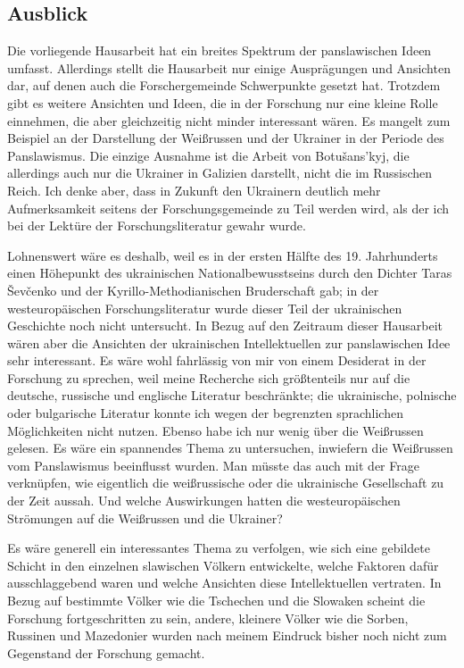 \documentclass{../../sem_paper}
\begin{document}
\subsection*{Ausblick}
Die vorliegende Hausarbeit hat ein breites Spektrum der panslawischen Ideen umfasst.
Allerdings stellt die Hausarbeit nur einige Ausprägungen und Ansichten dar, auf denen auch
die Forschergemeinde Schwerpunkte gesetzt hat. Trotzdem gibt es weitere Ansichten und
Ideen, die in der Forschung nur eine kleine Rolle einnehmen, die aber gleichzeitig nicht
minder interessant wären. Es mangelt zum Beispiel an der Darstellung der Weißrussen und
der Ukrainer in der Periode des Panslawismus. Die einzige Ausnahme ist die Arbeit von
Botušans'kyj\autocite{botushans}, die allerdings auch nur die Ukrainer in Galizien darstellt, nicht die im
Russischen Reich. Ich denke aber, dass in Zukunft den Ukrainern deutlich mehr
Aufmerksamkeit seitens der Forschungsgemeinde zu Teil werden wird, als der ich bei der
Lektüre der Forschungsliteratur gewahr wurde.

Lohnenswert wäre es deshalb, weil es in der ersten Hälfte des 19. Jahrhunderts einen
Höhepunkt des ukrainischen Nationalbewusstseins durch den Dichter Taras Ševčenko und der
Kyrillo-Methodianischen Bruderschaft gab; in der westeuropäischen Forschungsliteratur
wurde dieser Teil der ukrainischen Geschichte noch nicht untersucht. In Bezug auf den
Zeitraum dieser Hausarbeit wären aber die Ansichten der ukrainischen Intellektuellen zur
panslawischen Idee sehr interessant. Es wäre wohl fahrlässig von mir von einem Desiderat in
der Forschung zu sprechen, weil meine Recherche sich größtenteils nur auf die deutsche,
russische und englische Literatur beschränkte; die ukrainische, polnische oder bulgarische
Literatur konnte ich wegen der begrenzten sprachlichen Möglichkeiten nicht nutzen. Ebenso
habe ich nur wenig über die Weißrussen gelesen. Es wäre ein spannendes Thema zu
untersuchen, inwiefern die Weißrussen vom Panslawismus beeinflusst wurden. Man müsste
das auch mit der Frage verknüpfen, wie eigentlich die weißrussische oder die ukrainische
Gesellschaft zu der Zeit aussah. Und welche Auswirkungen hatten die westeuropäischen
Strömungen auf die Weißrussen und die Ukrainer?

Es wäre generell ein interessantes Thema zu verfolgen, wie sich eine gebildete Schicht in den
einzelnen slawischen Völkern entwickelte, welche Faktoren dafür ausschlaggebend waren und
welche Ansichten diese Intellektuellen vertraten. In Bezug auf bestimmte Völker wie die
Tschechen und die Slowaken scheint die Forschung fortgeschritten zu sein, andere, kleinere
Völker wie die Sorben, Russinen und Mazedonier wurden nach meinem Eindruck bisher noch
nicht zum Gegenstand der Forschung gemacht.

\literature
\end{document}
